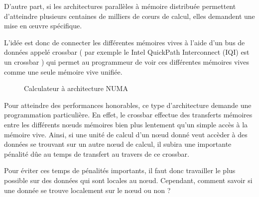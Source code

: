 \documentclass[fleqn,11pt]{article}
\begin{document}
D'autre part, si les architectures parallèles à mémoire distribuée permettent d'atteindre plusieurs 
centaines de milliers de cœurs de calcul, elles demandent une mise en œuvre spécifique. 

L'idée est donc de connecter les différentes mémoires vives à l'aide d'un bus de données appelé crossbar  
( par exemple le Intel QuickPath Interconnect (IQI) est un crossbar ) qui permet au programmeur de voir ces différentes mémoires vives comme une seule mémoire vive unifiée. 

\begin{figure}
\centering
{}
\caption{Calculateur à architecture NUMA}\label{fig:numa}
\end{figure}

Pour atteindre des performances honorables, ce type d'architecture demande une programmation particulière. En effet, le crossbar effectue des transferts mémoires entre les différents n{\oe}uds mémoires bien plus lentement qu'un simple accès à la mémoire vive. Ainsi, si une unité de calcul d'un n{\oe}ud donné veut accèder à des données se trouvant sur un autre n{\oe}ud de calcul, il subira une importante pénalité dûe au temps de transfert au travers de ce crossbar.

Pour éviter ces temps de pénalités importants, il faut donc travailler le plus possible sur des données qui sont locales au n{\oe}ud. Cependant, comment savoir si une donnée se trouve localement sur le n{\oe}ud ou non ?
\end{document}

